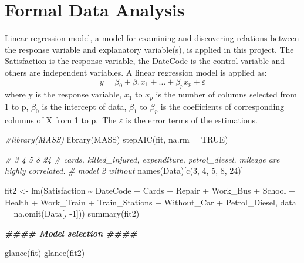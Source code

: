 \documentclass[
]{article}
\newenvironment{Shaded}{\begin{snugshade}}{\end{snugshade}}
\newcommand{\AttributeTok}[1]{\textcolor[rgb]{0.77,0.63,0.00}{#1}}
\newcommand{\CommentTok}[1]{\textcolor[rgb]{0.56,0.35,0.01}{\textit{#1}}}
\newcommand{\ConstantTok}[1]{\textcolor[rgb]{0.00,0.00,0.00}{#1}}
\newcommand{\DecValTok}[1]{\textcolor[rgb]{0.00,0.00,0.81}{#1}}
\newcommand{\DocumentationTok}[1]{\textcolor[rgb]{0.56,0.35,0.01}{\textbf{\textit{#1}}}}
\newcommand{\FunctionTok}[1]{\textcolor[rgb]{0.00,0.00,0.00}{#1}}
\newcommand{\NormalTok}[1]{#1}
\newcommand{\OtherTok}[1]{\textcolor[rgb]{0.56,0.35,0.01}{#1}}
\newcommand{\SpecialCharTok}[1]{\textcolor[rgb]{0.00,0.00,0.00}{#1}}
\begin{document}
\hypertarget{sec:FDA}{%
\section{Formal Data Analysis}\label{sec:FDA}}

Linear regression model, a model for examining and discovering relations
between the response variable and explanatory variable(s), is applied in
this project. The Satisfaction is the response variable, the DateCode is
the control variable and others are independent variables. A linear
regression model is applied as:
\[y=\beta_0+\beta_1x_1+\dots+\beta_px_p+\varepsilon \] where y is the
response variable, \(x_1\) to \(x_p\) is the number of columns selected
from 1 to p, \(\beta_0\) is the intercept of data, \(\beta_1\) to
\(\beta_p\) is the coefficients of corresponding columns of X from 1 to
p.~The \(\varepsilon\) is the error terms of the estimations.

\begin{Shaded}
\begin{Highlighting}[]
\CommentTok{\#library(MASS)}
\FunctionTok{library}\NormalTok{(MASS)}
\FunctionTok{stepAIC}\NormalTok{(fit, }\AttributeTok{na.rm =} \ConstantTok{TRUE}\NormalTok{)}

\CommentTok{\# 3 4 5 8 24}
\CommentTok{\# cards, killed\_injured, expenditure, petrol\_diesel, mileage are highly correlated.}
\CommentTok{\# model 2 without}
\FunctionTok{names}\NormalTok{(Data)[}\FunctionTok{c}\NormalTok{(}\DecValTok{3}\NormalTok{, }\DecValTok{4}\NormalTok{, }\DecValTok{5}\NormalTok{, }\DecValTok{8}\NormalTok{, }\DecValTok{24}\NormalTok{)]}

\NormalTok{fit2 }\OtherTok{\textless{}{-}} \FunctionTok{lm}\NormalTok{(Satisfaction }\SpecialCharTok{\textasciitilde{}}\NormalTok{ DateCode }\SpecialCharTok{+}\NormalTok{ Cards }\SpecialCharTok{+}\NormalTok{ Repair }\SpecialCharTok{+}\NormalTok{ Work\_Bus }\SpecialCharTok{+} 
\NormalTok{             School }\SpecialCharTok{+}\NormalTok{ Health }\SpecialCharTok{+}\NormalTok{ Work\_Train }\SpecialCharTok{+}\NormalTok{ Train\_Stations }\SpecialCharTok{+}\NormalTok{ Without\_Car }\SpecialCharTok{+} 
\NormalTok{             Petrol\_Diesel, }\AttributeTok{data =} \FunctionTok{na.omit}\NormalTok{(Data[, }\SpecialCharTok{{-}}\DecValTok{1}\NormalTok{]))}
\FunctionTok{summary}\NormalTok{(fit2)}

\DocumentationTok{\#\#\#\# Model selection \#\#\#\#}

\FunctionTok{glance}\NormalTok{(fit)}
\FunctionTok{glance}\NormalTok{(fit2)}
\end{Highlighting}
\end{Shaded}
\end{document}
